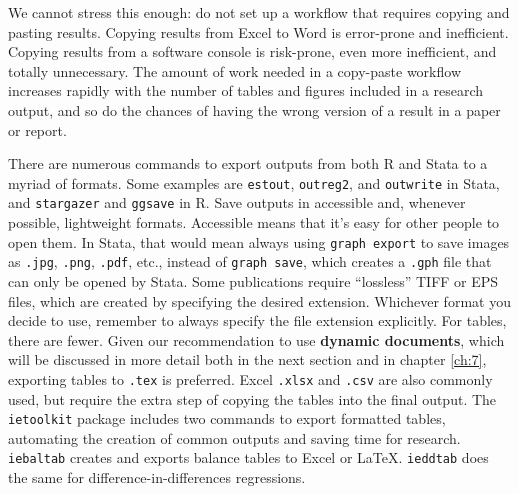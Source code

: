 We cannot stress this enough:
do not set up a workflow that requires copying and pasting results.
Copying results from Excel to Word is error-prone and inefficient.
Copying results from a software console is risk-prone,
even more inefficient, and totally unnecessary.
The amount of work needed in a copy-paste workflow increases
rapidly with the number of tables and figures included in a research output,
and so do the chances of having the wrong version of a result in a paper or report.

There are numerous commands to export outputs from both R and Stata to a myriad of formats.
Some examples are \texttt{estout},\cite{estout05, estout07}
\texttt{outreg2},
and \texttt{outwrite} in Stata,
and \texttt{stargazer}
and \texttt{ggsave} in R.
Save outputs in accessible and, whenever possible, lightweight formats.
Accessible means that it's easy for other people to open them.
In Stata, that would mean always using \texttt{graph export} to save images as
\texttt{.jpg}, \texttt{.png}, \texttt{.pdf}, etc.,
instead of \texttt{graph save},
which creates a \texttt{.gph} file that can only be opened by Stata.
Some publications require ``lossless'' TIFF or EPS files, 
which are created by specifying the desired extension.
Whichever format you decide to use, 
remember to always specify the file extension explicitly.
For tables, there are fewer.
Given our recommendation to use \textbf{dynamic documents},
which will be discussed in more detail both in the next section and in chapter \ref{ch:7},
exporting tables to \texttt{.tex} is preferred.
Excel \texttt{.xlsx} and \texttt{.csv} are also commonly used,
but require the extra step of copying the tables into the final output.
The \texttt{ietoolkit} package includes two commands to export formatted tables,
automating the creation of common outputs and saving time for research.
\texttt{iebaltab}
creates and exports balance tables to Excel or {\LaTeX}.
\texttt{ieddtab}
does the same for difference-in-differences regressions.

